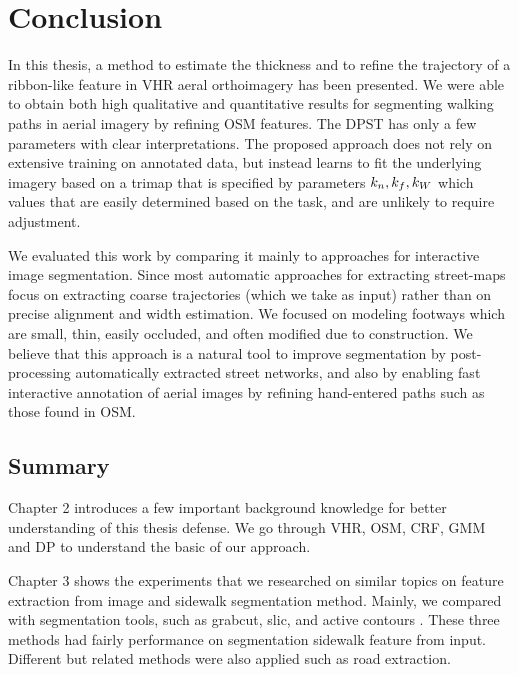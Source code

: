 \chapter{Conclusion}
In this thesis, a method to estimate the thickness and to refine the trajectory of a ribbon-like feature in \ac{VHR} aeral orthoimagery has been presented. 
We were able to obtain both high qualitative and quantitative results for segmenting walking paths in aerial imagery by refining \ac{OSM} features. 
The \ac{DPST} has only a few parameters with clear interpretations.
The proposed approach does not rely on extensive training on annotated data, but instead learns to fit the underlying imagery based on a trimap that is specified by parameters $k_n{}, k_f{}, k_W{}$ which values that are easily determined based on the task, and are unlikely to require adjustment. 

We evaluated this work by comparing it mainly to approaches for interactive image segmentation. 
Since most automatic approaches for extracting street-maps focus on extracting coarse trajectories (which we take as input) rather than on precise alignment and width estimation. 
We focused on modeling footways which are small, thin, easily occluded, and often modified due to construction.
We believe that this approach is a natural tool to improve segmentation by post-processing automatically extracted street networks, and also by enabling fast interactive annotation of aerial images by refining hand-entered paths such as those found in \ac{OSM}.

\section{Summary}
Chapter 2 introduces a few important background knowledge for better understanding of this thesis defense. We go through \ac{VHR}, \ac{OSM}\cite{OpenStreetMap}, \ac{CRF}\cite{MAL-013}, \ac{GMM}\cite{sridharan2014gaussian} and \ac{DP}\cite{bellman2013dynamic} to understand the basic of our approach.   

Chapter 3 shows the experiments that we researched on similar topics on feature extraction from image and sidewalk segmentation method. Mainly, we compared with segmentation tools, such as grabcut\cite{Rother2004-ou}, slic\cite{Achanta:149300}, and active contours \cite{Kass88snakes:active}. These three methods had fairly performance on segmentation sidewalk feature from input. Different but related methods were also applied such as road extraction\cite{road_detect}.


